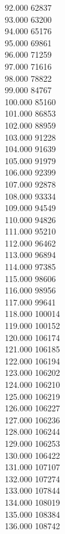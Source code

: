 { 92.000	62837 \\
 93.000	63200 \\
 94.000	65176 \\
 95.000	69861 \\
 96.000	71259 \\
 97.000	71616 \\
 98.000	78822 \\
 99.000	84767 \\
 100.000	85160 \\
 101.000	86853 \\
 102.000	88959 \\
 103.000	91228 \\
 104.000	91639 \\
 105.000	91979 \\
 106.000	92399 \\
 107.000	92878 \\
 108.000	93334 \\
 109.000	94549 \\
 110.000	94826 \\
 111.000	95210 \\
 112.000	96462 \\
 113.000	96894 \\
 114.000	97385 \\
 115.000	98606 \\
 116.000	98956 \\
 117.000	99641 \\
 118.000	100014 \\
 119.000	100152 \\
 120.000	106174 \\
 121.000	106185 \\
 122.000	106194 \\
 123.000	106202 \\
 124.000	106210 \\
 125.000	106219 \\
 126.000	106227 \\
 127.000	106236 \\
 128.000	106244 \\
 129.000	106253 \\
 130.000	106422 \\
 131.000	107107 \\
 132.000	107274 \\
 133.000	107844 \\
 134.000	108019 \\
 135.000	108384 \\
 136.000	108742 \\
}
